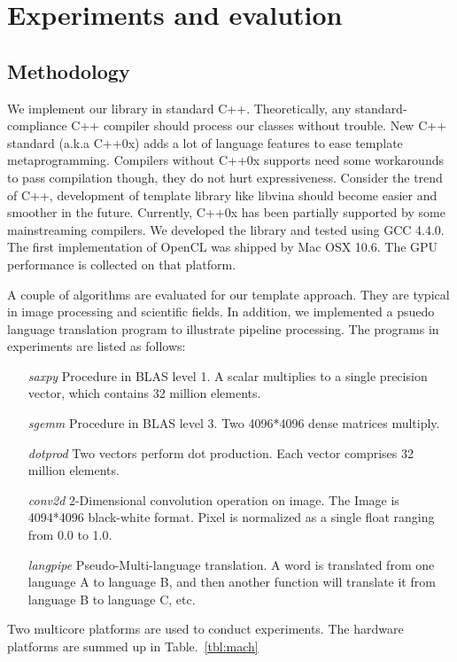 \section{Experiments and evalution}
\subsection{Methodology}\label{sectn:method}
We implement our library in standard
C++\cite{c++03, c++0x}. Theoretically, any standard-compliance C++ compiler
should process our classes without trouble. New C++ standard (a.k.a C++0x)\cite{c++0x} adds a
lot of language features to ease template metaprogramming. Compilers
without C++0x supports need some workarounds to pass compilation
though, they do not hurt expressiveness. Consider the trend of C++,
development of template library like libvina should become easier
and smoother in the future.  Currently, C++0x has been partially supported by some mainstreaming
compilers.  We developed the library and tested using GCC 4.4.0.  The
first implementation of OpenCL was shipped by Mac OSX 10.6. The GPU performance is collected on that platform.

A couple of algorithms are evaluated for our template approach.  They
are typical in image processing and scientific fields. In
addition, we implemented a psuedo language translation program to
illustrate pipeline processing. The programs in experiments are listed
as follows:

\begin{itemize}
\item[\textit{saxpy}] Procedure in BLAS level 1. A scalar multiplies to a single precision vector, which contains 32 million elements.
\item[\textit{sgemm}] Procedure in BLAS level 3. Two 4096*4096 dense matrices multiply.
\item[\textit{dotprod}] Two vectors perform dot production. Each vector
  comprises 32 million elements.
\item[\textit{conv2d}] 2-Dimensional convolution operation on image.  The Image
  is 4094*4096 black-white format. Pixel is normalized as a single
  float ranging from 0.0 to 1.0.
\item[\textit{langpipe}] Pseudo-Multi-language translation. A word is translated from one language A to language B, and then another function will translate it from language B to language C, etc.
\end{itemize}

Two multicore platforms are used to conduct experiments. The hardware
platforms are summed up in Table.~\ref{tbl:mach}

